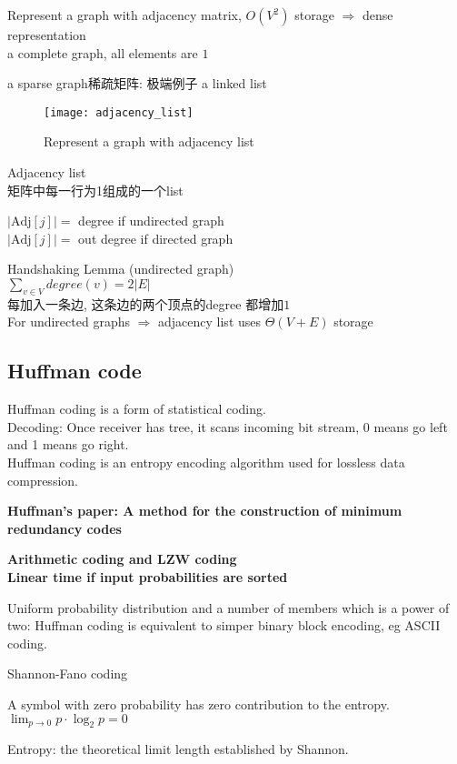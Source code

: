 \documentclass{article}
\begin{document}
Represent a graph with adjacency matrix, $O(V^2)$ storage $\Rightarrow$ dense representation\\
a complete graph, all elements are $1$

a sparse graph稀疏矩阵: 极端例子 a linked list
\begin{figure}[htbp]
  \centering
  \texttt{[image: adjacency\_list]}\\
  \caption{Represent a graph with adjacency list}\label{fig.adjacency.list}
\end{figure}

Adjacency list\\
矩阵中每一行为1组成的一个list

\noindent
$|\mbox{Adj}[j]| =$ degree  if undirected graph\\
$|\mbox{Adj}[j]| =$ out degree  if directed graph

Handshaking Lemma (undirected graph)\\
$\sum_{v \in V} degree(v) = 2|E|$\\
每加入一条边, 这条边的两个顶点的degree 都增加$1$\\
For undirected graphs $\Rightarrow$ adjacency list uses $\Theta(V+E)$ storage

\subsection{Huffman code}
Huffman coding is a form of statistical coding.\\
Decoding: Once receiver has tree, it scans incoming bit stream, 0 means go left and 1 means go right.\\
Huffman coding is an entropy encoding algorithm used for lossless data compression.

\textbf{Huffman's paper: A method for the construction of minimum redundancy codes}

\textbf{Arithmetic coding and LZW coding}\\
\textbf{Linear time if input probabilities are sorted}

Uniform probability distribution and a number of members which is a power of two: Huffman coding is equivalent to simper binary block encoding, eg ASCII coding.

Shannon-Fano coding

A symbol with zero probability has zero contribution to the entropy.\\
$\lim_{p \to 0} p \cdot \log_{2} p = 0$

Entropy: the theoretical limit length established by Shannon.
\end{document}
